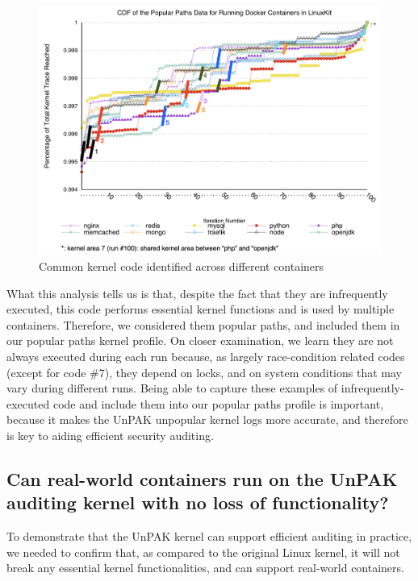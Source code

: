 \begin{figure}
\centering
\includegraphics[width=1.5\columnwidth]{diagram/cdf-marked.png}
\caption{\small Common kernel code identified across different containers}
\label{fig:cdf-marked}
\end{figure}

What this analysis tells us is that, despite the fact that they are infrequently executed, this  code performs essential kernel functions and is used by multiple containers. 
Therefore, we considered them popular paths, and included them in our popular paths kernel profile. On closer examination, we learn they are not always executed during each run  because, 
as largely race-condition related codes (except for code \#7), they depend on locks, and on system conditions that may vary during different runs. 
Being able to capture these examples of infrequently-executed code and include them into our popular paths profile is important, because it makes the UnPAK unpopular kernel logs more accurate, 
and therefore is key to aiding efficient security auditing. 


\subsection{Can real-world containers run on the UnPAK auditing kernel with no loss of functionality?}
\label{sec.evaluation.3} 
To demonstrate that the UnPAK kernel can support efficient auditing in practice, we needed to confirm that, as compared to the original Linux kernel, 
it will not break any essential kernel functionalities, and can support real-world containers.

